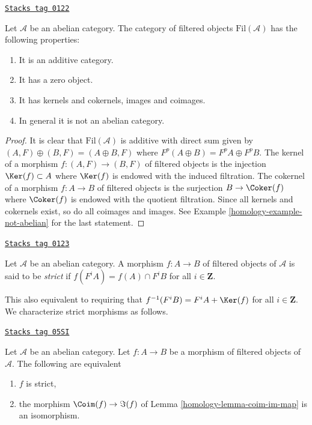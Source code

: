 \begin{lemma}[Filtered]
\label{homology-lemma-filtered}
\href{https://stacks.math.columbia.edu/tag/0122}{\texttt{Stacks tag 0122}}

Let $\mathcal{A}$ be an abelian category.
The category of filtered objects $\text{Fil}(\mathcal{A})$
has the following properties:
\begin{enumerate}
\item It is an additive category.
\item It has a zero object.
\item It has kernels and cokernels, images and coimages.
\item In general it is not an abelian category.
\end{enumerate}
\end{lemma}

\begin{proof}

It is clear that $\text{Fil}(\mathcal{A})$ is additive with direct
sum given by $(A, F) \oplus (B, F) = (A \oplus B, F)$ where
$F^p(A \oplus B) = F^pA \oplus F^pB$.
The kernel of a morphism $f : (A, F) \to (B, F)$ of filtered
objects is the injection $\Ker(f) \subset A$ where $\Ker(f)$
is endowed with the induced filtration.
The cokernel of a morphism $f : A \to B$ of filtered
objects is the surjection $B \to \Coker(f)$ where $\Coker(f)$
is endowed with the quotient filtration. Since all kernels and cokernels
exist, so do all coimages and images. See
Example \ref{homology-example-not-abelian}
for the last statement.
\end{proof}

\begin{definition}[Strict]
\label{homology-definition-strict}
\href{https://stacks.math.columbia.edu/tag/0123}{\texttt{Stacks tag 0123}}

Let $\mathcal{A}$ be an abelian category.
A morphism $f : A \to B$ of filtered objects of $\mathcal{A}$ is
said to be {\it strict} if $f(F^iA) = f(A) \cap F^iB$ for
all $i \in \mathbf{Z}$.
\end{definition}

This also equivalent to requiring that $f^{-1}(F^iB) = F^iA + \Ker(f)$
for all $i \in \mathbf{Z}$. We characterize strict morphisms
as follows.

\begin{lemma}
\label{homology-lemma-characterize-strict-general}
\href{https://stacks.math.columbia.edu/tag/05SI}{\texttt{Stacks tag 05SI}}

Let $\mathcal{A}$ be an abelian category.
Let $f : A \to B$ be a morphism of filtered objects of $\mathcal{A}$.
The following are equivalent
\begin{enumerate}
\item $f$ is strict,
\item the morphism $\Coim(f) \to \Im(f)$ of
Lemma \ref{homology-lemma-coim-im-map}
is an isomorphism.
\end{enumerate}
\end{lemma}

